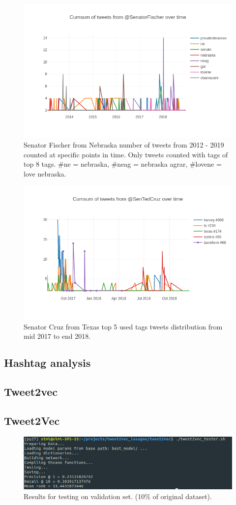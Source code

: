 \documentclass[10pt,conference,compsocconf]{IEEEtran}
\begin{document}
\begin{figure}
	\centering
	\includegraphics[width=0.7\linewidth]{images/senator_fischer_before_after_election}
	\caption{Senator Fischer from Nebraska number of tweets from 2012 - 2019 counted at specific points in time. Only tweets counted with tags of top 8 tags. \#ne = nebraska, \#neag = nebraska agrar, \#lovene = love nebraska.   }
	\label{fig:senatorfischerbeforeafterelection}
\end{figure}
\begin{figure}
	\centering
	\includegraphics[width=0.7\linewidth]{images/senator_cruz_top5_tweets_mid2017_2018}
	\caption{Senator Cruz from Texas top 5 used tags tweets distribution from mid 2017 to end 2018.}
	\label{fig:senatorcruztop5tweetsmid20172018}
\end{figure}


\subsection{Hashtag analysis}


\subsection{Tweet2vec}


\subsection{Tweet2Vec}
\begin{figure}
	\centering
	\includegraphics[width=0.7\linewidth]{images/tweet2vec_training}
	\caption{Results for testing on validation set. (10\% of original dataset).}
	\label{fig:tweet2vectraining}
\end{figure}
\end{document}
